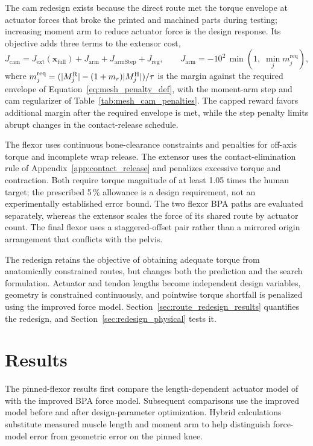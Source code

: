The cam redesign exists because the direct route met the torque envelope at actuator forces that broke the printed and machined parts during testing; increasing moment arm to reduce actuator force is the design response. Its objective adds three terms to the extensor cost,
\begin{equation}
J_{\mathrm{cam}} = J_{\mathrm{ext}}\!\left(\mathbf{x}_{\mathrm{full}}\right) + J_{\mathrm{arm}} + J_{\mathrm{armStep}} + J_{\mathrm{reg}},
\qquad
J_{\mathrm{arm}} = -10^{2}\,\min\!\left(1,\; \min_{j} m^{\mathrm{req}}_{j}\right),
\label{eq:opt_cost_cam}
\end{equation}
where $m^{\mathrm{req}}_{j} = (\lvert M^{\mathrm{R}}_{j}\rvert - (1+m_{r})\lvert M^{\mathrm{H}}_{j}\rvert)/\tau$ is the margin against the required envelope of Equation~\eqref{eq:mesh_penalty_def}, with the moment-arm step and cam regularizer of Table~\ref{tab:mesh_cam_penalties}. The capped reward favors additional margin after the required envelope is met, while the step penalty limits abrupt changes in the contact-release schedule.

The flexor uses continuous bone-clearance constraints and penalties for off-axis torque and incomplete wrap release. The extensor uses the contact-elimination rule of Appendix~\ref{app:contact_release} and penalizes excessive torque and contraction. Both require torque magnitude of at least 1.05 times the human target; the prescribed 5\,\% allowance is a design requirement, not an experimentally established error bound. The two flexor BPA paths are evaluated separately, whereas the extensor scales the force of its shared route by actuator count. The final flexor uses a staggered-offset pair rather than a mirrored origin arrangement that conflicts with the pelvis.

The redesign retains the objective of obtaining adequate torque from anatomically constrained routes, but changes both the prediction and the search formulation. Actuator and tendon lengths become independent design variables, geometry is constrained continuously, and pointwise torque shortfall is penalized using the improved force model. Section~\ref{sec:route_redesign_results} quantifies the redesign, and Section~\ref{sec:redesign_physical} tests it.

\section{Results}\label{sec:results_torque}

\begingroup
{}
The pinned-flexor results first compare the length-dependent actuator model of \citet{hunt_modeling_2017} with the improved BPA force model. Subsequent comparisons use the improved model before and after design-parameter optimization. Hybrid calculations substitute measured muscle length and moment arm to help distinguish force-model error from geometric error on the pinned knee.
\par
\endgroup

